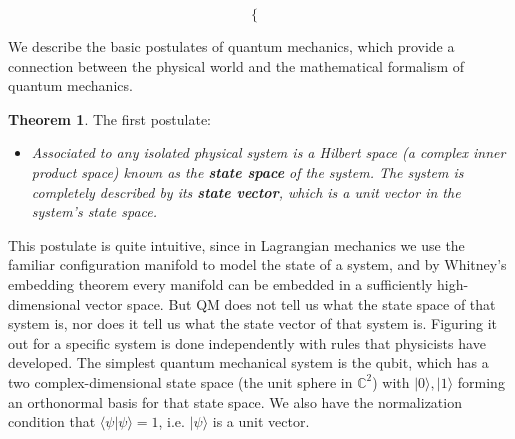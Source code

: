 \documentclass{article}
\theoremstyle{definition}
\newtheorem{theorem}{Theorem}[section]
\begin{document}
\[\begin{cases}
    \end{cases}
  \]

We describe the basic postulates of quantum mechanics, which provide a connection between the physical world and the mathematical formalism of quantum mechanics.


\begin{theorem}
The first postulate:
\begin{itemize}
    \item \textit{Associated to any isolated physical system is a Hilbert space (a complex inner product space) known as the \textbf{state space} of the system. The system is completely described by its \textbf{state vector}, which is a unit vector in the system's state space.}
\end{itemize}
This postulate is quite intuitive, since in Lagrangian mechanics we use the familiar configuration manifold to model the state of a system, and by Whitney's embedding theorem every manifold can be embedded in a sufficiently high-dimensional vector space. But QM does not tell us what the state space of that system is, nor does it tell us what the state vector of that system is. Figuring it out for a specific system is done independently with rules that physicists have developed.
The simplest quantum mechanical system is the qubit, which has a two complex-dimensional state space (the unit sphere in $\mathbb{C}^2$) with $|0\rangle, |1\rangle$ forming an orthonormal basis for that state space. We also have the normalization condition that $\langle \psi | \psi \rangle = 1$, i.e. $|\psi\rangle$ is a unit vector.   
\end{theorem}
\end{document}

